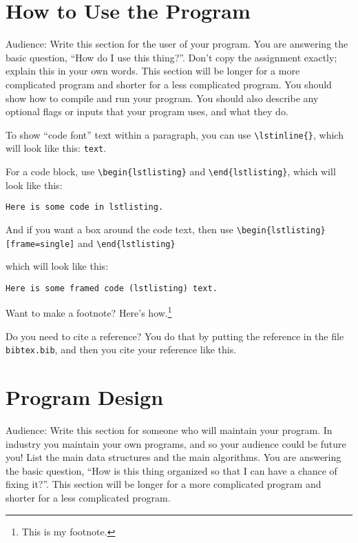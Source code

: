 \documentclass{article}
\begin{document}
\section{How to Use the Program}

Audience: Write this section for the user
of your program. You are answering the
basic question, ``How do I use this
thing?''. Don't copy the assignment
exactly; explain this in your own
words.
This section will be longer for a more 
complicated program and shorter for a
less complicated program.
You should show how to compile and run your program. 
You should also describe any optional flags or inputs that
your program uses, and what they do. 

To show ``code font'' text within a paragraph,
you can use \lstinline|\lstinline{}|,
which will look like this: \lstinline|text|.


For a code block,
use \lstinline|\begin{lstlisting}| and
\lstinline|\end{lstlisting}|,
which will look like this:

\begin{lstlisting}
Here is some code in lstlisting.
\end{lstlisting}

And if you want a box around the code
text, then 
use \lstinline|\begin{lstlisting}[frame=single]| and
\lstinline|\end{lstlisting}|

which will look like this:

\begin{lstlisting}[frame=single]
Here is some framed code (lstlisting) text.
\end{lstlisting}

Want to make a footnote?
Here's how.\footnote{This is my footnote.}

Do you need to cite a reference?
You do that by putting the reference
in the file \lstinline|bibtex.bib|,
and then you cite your reference like
this\cite{wiki:C}\cite{Mecklenburg:2005a}\cite{Tschinkel:2007a}.

\section{Program Design}

Audience: Write this section for someone
who will maintain your program.
In industry you maintain your own
programs, and so your audience could be
future you! List
the main data structures and the main
algorithms. You are answering the basic
question, ``How is this thing organized
so that I can have a chance of fixing
it?''. This section will be longer for a
more complicated program and shorter for
a less complicated program.
\end{document}
